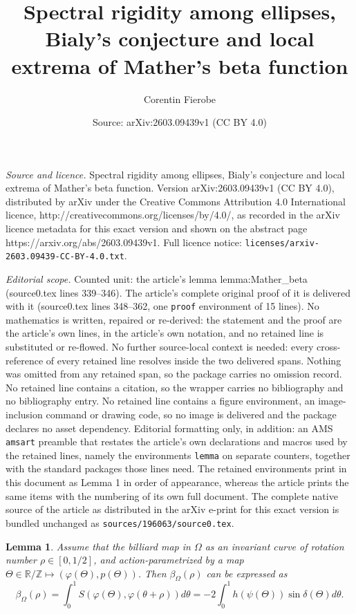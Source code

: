 \documentclass[10pt,a4paper]{amsart}
\title{Spectral rigidity among ellipses, Bialy's conjecture and local extrema of Mather's beta function}
\author{Corentin Fierobe}
\date{Source: arXiv:2603.09439v1 (CC BY 4.0)}
\newtheorem{lemma}{Lemma}
\def\R{\mathbb{R}}
\def\Z{\mathbb{Z}}
\begin{document}
\maketitle

\noindent\emph{Source and licence.} Spectral rigidity among ellipses, Bialy's conjecture and local extrema of Mather's beta function. Version arXiv:2603.09439v1 (CC BY 4.0), distributed by arXiv under the Creative Commons Attribution 4.0 International licence, http://creativecommons.org/licenses/by/4.0/, as recorded in the arXiv licence metadata for this exact version and shown on the abstract page https://arxiv.org/abs/2603.09439v1. Full licence notice: \texttt{licenses/arxiv-2603.09439-CC-BY-4.0.txt}.\par\smallskip

\noindent\textit{Editorial scope.} Counted unit: the article's lemma lemma:Mather\_beta (source0.tex lines 339--346). The article's complete original proof of it is delivered with it (source0.tex lines 348--362, one \texttt{proof} environment of 15 lines). No mathematics is written, repaired or re-derived: the statement and the proof are the article's own lines, in the article's own notation, and no retained line is substituted or re-flowed.  No further source-local context is needed: every cross-reference of every retained line resolves inside the two delivered spans.  Nothing was omitted from any retained span, so the package carries no omission record.  No retained line contains a citation, so the wrapper carries no bibliography and no bibliography entry.  No retained line contains a figure environment, an image-inclusion command or drawing code, so no image is delivered and the package declares no asset dependency.  Editorial formatting only, in addition: an AMS \texttt{amsart} preamble that restates the article's own declarations and macros used by the retained lines, namely the environments \texttt{lemma} on separate counters, together with the standard packages those lines need.  The retained environments print in this document as Lemma 1 in order of appearance, whereas the article prints the same items with the numbering of its own full document.  The complete native source of the article as distributed in the arXiv e-print for this exact version is bundled unchanged as \texttt{sources/196063/source0.tex}.
\begin{lemma}
\label{lemma:Mather_beta}
    Assume that the billiard map in $\Omega$ as an invariant curve of rotation number $\rho\in[0,1/2]$, and action-parametrized by a map $\Theta\in\R/\Z\mapsto (\varphi(\Theta),p(\Theta))$.
    Then $\beta_{\Omega}(\rho)$ can be expressed as
    \[
    \beta_{\Omega}(\rho) = \int_0^1S(\varphi(\Theta),\varphi(\theta+\rho))d\theta = -2\int_0^1 h(\psi(\Theta))\sin\delta(\Theta)d\theta.
    \]
\end{lemma}
\end{document}
